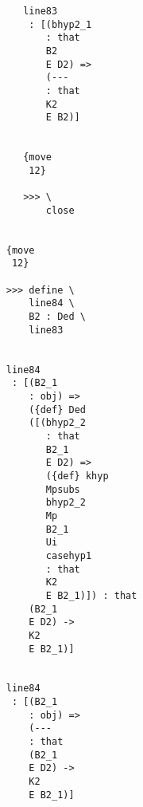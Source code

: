 \documentclass[12pt]{article}
\begin{document}
\begin{verbatim}
                                       line83 
                                        : [(bhyp2_1 
                                           : that 
                                           B2 
                                           E D2) => 
                                           (--- 
                                           : that 
                                           K2 
                                           E B2)]


                                       {move 
                                        12}

                                       >>> \
                                           close


                                    {move 
                                     12}

                                    >>> define \
                                        line84 \
                                        B2 : Ded \
                                        line83


                                    line84 
                                     : [(B2_1 
                                        : obj) => 
                                        ({def} Ded 
                                        ([(bhyp2_2 
                                           : that 
                                           B2_1 
                                           E D2) => 
                                           ({def} khyp 
                                           Mpsubs 
                                           bhyp2_2 
                                           Mp 
                                           B2_1 
                                           Ui 
                                           casehyp1 
                                           : that 
                                           K2 
                                           E B2_1)]) : that 
                                        (B2_1 
                                        E D2) -> 
                                        K2 
                                        E B2_1)]


                                    line84 
                                     : [(B2_1 
                                        : obj) => 
                                        (--- 
                                        : that 
                                        (B2_1 
                                        E D2) -> 
                                        K2 
                                        E B2_1)]



\end{verbatim}
\end{document}

